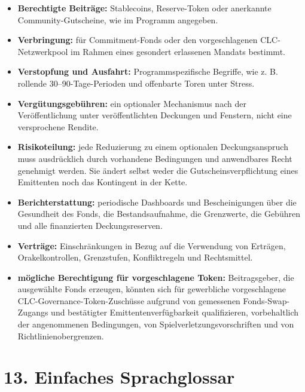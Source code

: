 \documentclass[11pt]{article}
\begin{document}
\begin{itemize}[leftmargin=*]
\item \textbf{Berechtigte Beiträge:} Stablecoins, Reserve-Token oder anerkannte Community-Gutscheine, wie im Programm angegeben.
\item \textbf{Verbringung:} für Commitment-Fonds oder den vorgeschlagenen CLC-Netzwerkpool im Rahmen eines gesondert erlassenen Mandats bestimmt.
\item \textbf{Verstopfung und Ausfahrt:} Programmspezifische Begriffe, wie z. B. rollende 30--90-Tage-Perioden und offenbarte Toren unter Stress.
\item \textbf{Vergütungsgebühren:} ein optionaler Mechanismus nach der Veröffentlichung unter veröffentlichten Deckungen und Fenstern, nicht eine versprochene Rendite.
\item \textbf{Risikoteilung:} jede Reduzierung zu einem optionalen Deckungsanspruch muss ausdrücklich durch vorhandene Bedingungen und anwendbares Recht genehmigt werden. Sie ändert selbst weder die Gutscheinsverpflichtung eines Emittenten noch das Kontingent in der Kette.
\item \textbf{Berichterstattung:} periodische Dashboards und Bescheinigungen über die Gesundheit des Fonds, die Bestandsaufnahme, die Grenzwerte, die Gebühren und alle finanzierten Deckungsreserven.
\item \textbf{Verträge:} Einschränkungen in Bezug auf die Verwendung von Erträgen, Orakelkontrollen, Grenzstufen, Konfliktregeln und Rechtsmittel.
\item \textbf{mögliche Berechtigung für vorgeschlagene Token:} Beitragsgeber, die ausgewählte Fonds erzeugen, könnten sich für gewerbliche vorgeschlagene CLC-Governance-Token-Zuschüsse aufgrund von gemessenen Fonds-Swap-Zugangs und bestätigter Emittentenverfügbarkeit qualifizieren, vorbehaltlich der angenommenen Bedingungen, von Spielverletzungsvorschriften und von Richtlinienobergrenzen.
\end{itemize}


\section*{13. Einfaches Sprachglossar}
\end{document}
